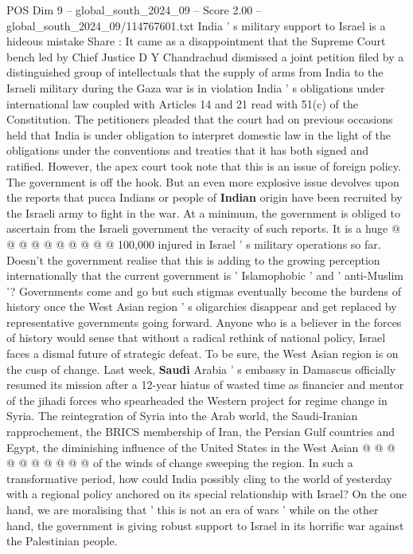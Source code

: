 \begin{textsample}{POS Dim 9 – global\_south\_2024\_09 – Score 2.00 – global\_south\_2024\_09/114767601.txt}  \label{ex:f9_pos_336}
India ' s military support to Israel is a hideous mistake Share : It came as a disappointment that the Supreme Court bench led by Chief Justice D Y Chandrachud dismissed a joint petition filed by a distinguished group of intellectuals that the supply of arms from India to the Israeli military during the Gaza war is in violation India ' s obligations under international law coupled with Articles 14 and 21 read with 51(c) of the Constitution.
The petitioners pleaded that the court had on previous occasions held that India is under obligation to interpret domestic law in the light of the obligations under the conventions and treaties that it has both signed and ratified.
However, the apex court took note that this is an issue of foreign policy.
The government is off the hook.
But an even more explosive issue devolves upon the reports that pucca Indians or people of \textbf{Indian} origin have been recruited by the Israeli army to fight in the war.
At a minimum, the government is obliged to ascertain from the Israeli government the veracity of such reports.
It is a huge @ @ @ @ @ @ @ @ @ @ 100,000 injured in Israel ' s military operations so far.
Doesn't the government realise that this is adding to the growing perception internationally that the current government is ' Islamophobic ' and ' anti-Muslim '?
Governments come and go but such stigmas eventually become the burdens of history once the West Asian region ' s oligarchies disappear and get replaced by representative governments going forward.
Anyone who is a believer in the forces of history would sense that without a radical rethink of national policy, Israel faces a dismal future of strategic defeat.
To be sure, the West Asian region is on the cusp of change.
Last week, \textbf{Saudi} Arabia ' s embassy in Damascus officially resumed its mission after a 12-year hiatus of wasted time as financier and mentor of the jihadi forces who spearheaded the Western project for regime change in Syria.
The reintegration of Syria into the Arab world, the Saudi-Iranian rapprochement, the BRICS membership of Iran, the Persian Gulf countries and Egypt, the diminishing influence of the United States in the West Asian @ @ @ @ @ @ @ @ @ @ of the winds of change sweeping the region.
In such a transformative period, how could India possibly cling to the world of yesterday with a regional policy anchored on its special relationship with Israel?
On the one hand, we are moralising that ' this is not an era of wars ' while on the other hand, the government is giving robust support to Israel in its horrific war against the Palestinian people.

\end{textsample}
